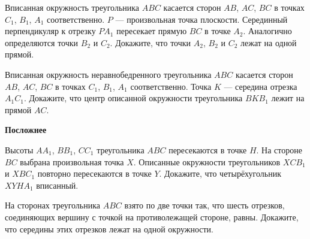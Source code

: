 \documentclass{article}
\begin{document}
\begin{enumerate_boxed}
        \item Вписанная окружность треугольника $ABC$ касается сторон $AB$, $AC$, $BC$ в точках $C_1$, $B_1$, $A_1$ соответственно. $P$ — произвольная точка плоскости.
        Серединный перпендикуляр к отрезку $PA_1$ пересекает прямую $BC$ в точке $A_2$.
        Аналогично определяются точки $B_2$ и $C_2$.
        Докажите, что точки $A_2$, $B_2$ и $C_2$ лежат на одной прямой.

        \item Вписанная окружность неравнобедренного треугольника $ABC$ касается сторон $AB$, $AC$, $BC$ в точках $C_1$, $B_1$, $A_1$ соответственно.
        Точка $K$ — середина отрезка $A_{1}C_1$.
        Докажите, что центр описанной окружности треугольника $BKB_1$ лежит на прямой $AC$.

        \newpage
        \textbf{Посложнее}

        \item Высоты $AA_1$, $BB_1$, $CC_1$ треугольника $ABC$ пересекаются в точке $H$.
        На стороне $BC$ выбрана произвольная точка $X$.
        Описанные окружности треугольников $XCB_1$ и $XBC_1$ повторно пересекаются в точке $Y$.
        Докажите, что четырёхугольник $XYHA_1$ вписанный.

        \item На сторонах треугольника $ABC$ взято по две точки так, что шесть отрезков, соединяющих вершину с точкой на противолежащей стороне, равны.
        Докажите, что середины этих отрезков лежат на одной окружности.


    \end{enumerate_boxed}
\end{document}
